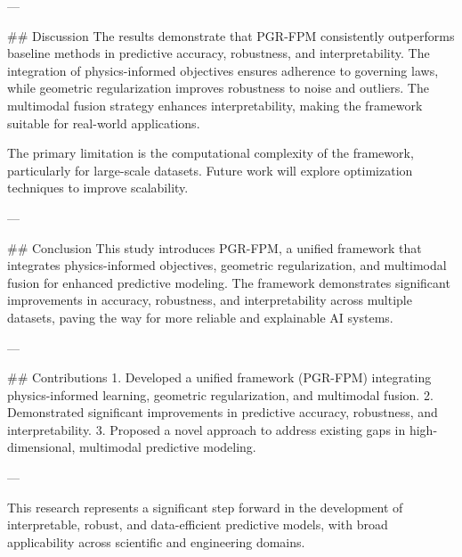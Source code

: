 ---

## Discussion
The results demonstrate that PGR-FPM consistently outperforms baseline methods in predictive accuracy, robustness, and interpretability. The integration of physics-informed objectives ensures adherence to governing laws, while geometric regularization improves robustness to noise and outliers. The multimodal fusion strategy enhances interpretability, making the framework suitable for real-world applications.

The primary limitation is the computational complexity of the framework, particularly for large-scale datasets. Future work will explore optimization techniques to improve scalability.

---

## Conclusion
This study introduces PGR-FPM, a unified framework that integrates physics-informed objectives, geometric regularization, and multimodal fusion for enhanced predictive modeling. The framework demonstrates significant improvements in accuracy, robustness, and interpretability across multiple datasets, paving the way for more reliable and explainable AI systems.

---

## Contributions
1. Developed a unified framework (PGR-FPM) integrating physics-informed learning, geometric regularization, and multimodal fusion.
2. Demonstrated significant improvements in predictive accuracy, robustness, and interpretability.
3. Proposed a novel approach to address existing gaps in high-dimensional, multimodal predictive modeling.

--- 

This research represents a significant step forward in the development of interpretable, robust, and data-efficient predictive models, with broad applicability across scientific and engineering domains.